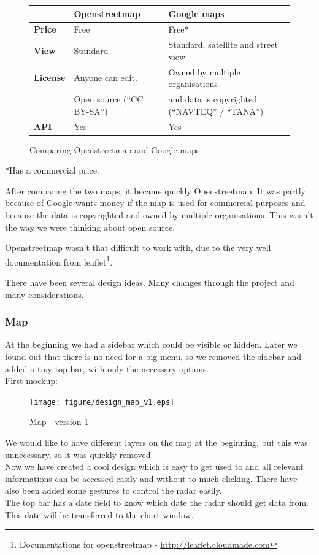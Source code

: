 \begin{figure}[htbp]
\begin{tabular}{| l | l | l |}
\hline
& \textbf{Openstreetmap} & \textbf{Google maps} \\
\hline
\textbf{Price} & Free & Free* \\
\hline
\textbf{View} & Standard & Standard, satellite and street view \\
\hline
\multirow{1}{*}{\textbf{License}} & Anyone can edit. & Owned by multiple organisations \\ & Open source (``CC BY-SA'') & and data is copyrighted (``NAVTEQ'' / ``TANA'') \\
\hline
\textbf{API} & Yes & Yes \\
\hline
\end{tabular}
\caption{Comparing Openstreetmap and Google maps}
\end{figure}
*Has a commercial price.

After comparing the two maps, it became quickly Openstreetmap. It was partly because of Google wants money if the map is used for commercial purposes and because the data is copyrighted and owned by multiple organisations. This wasn't the way we were thinking about open source.

Openstreetmap wasn't that difficult to work with, due to the very well documentation from leaflet\footnote{Documentations for openstreetmap - \url{http://leaflet.cloudmade.com}}.

There have been several design ideas. Many changes through the project and many considerations.
\subsubsection{Map}
At the beginning we had a sidebar which could be visible or hidden. Later we found out that there is no need for a big menu, so we removed the sidebar and added a tiny top bar, with only the necessary options.\\
First mockup:
\begin{figure}[htbp]
   \centering
   \texttt{[image: figure/design\_map\_v1.eps]}
   \caption{Map - version 1}
\end{figure}

We would like to have different layers on the map at the beginning, but this was unnecessary, so it was quickly removed.\\
Now we have created a cool design which is easy to get used to and all relevant informations can be accessed easily and without to much clicking.
There have also been added some gestures to control the radar easily.\\
The top bar has a date field to know which date the radar should get data from. This date will be transferred to the chart window.

